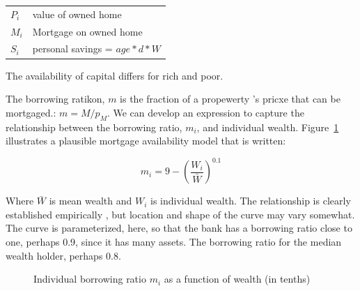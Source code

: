 \begin{tabular}{ll}
$P_i$ & value of owned home\\
$M_i$ & Mortgage on owned home\\
$S_i$ & personal savings = $age*d*W$\\
\end{tabular}

The availability of capital differs for rich and poor. 

The borrowing ratikon, $m$ is the fraction of a propewerty 's pricxe that can be mortgaged.: $m=M/p_M$. We can develop an expression to capture the relationship between the \gls{borrowing ratio}, $m_i$,  and individual wealth. Figure~\ref{Fig:Borrowingratio} illustrates a plausible mortgage availability  model that is written:

 \[ m_i = 9-\left(\frac{W_i}{\bar W}\right)^{0.1} \]

 
Where $\bar{W}$ is mean wealth and $W_i$ is individual wealth. 
The relationship is clearly established empirically \cite{}, but location and shape of the curve may vary somewhat. The curve is parameterized, here, so that the bank has a borrowing ratio close to one, perhaps 0.9, since it has many assets. The borrowing ratio for the median wealth holder, perhaps 0.8.



\begin{figure}[htb]
\caption{Individual borrowing ratio $m_i$ as a function of wealth (in tenths)}
 \label{Fig:Borrowingratio}
\end{figure}


